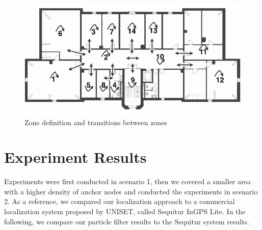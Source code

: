 \begin{figure}[th]
\centering
\includegraphics[width=1.0\textwidth]{Figures/zone_definition}
\decoRule
\caption[Zone Definition]{Zone definition and transitions between zones}
\label{fig:zone_definition}
\end{figure}

\section{Experiment Results}
Experiments were first conducted in scenario 1, then we covered a smaller area with a higher density of anchor nodes and conducted the experiments in scenario 2. As a reference, we compared our localization approach to a commercial localization system proposed by UNISET, called Sequitur InGPS Lite. In the following, we compare our particle filter results to the Sequitur system results.

